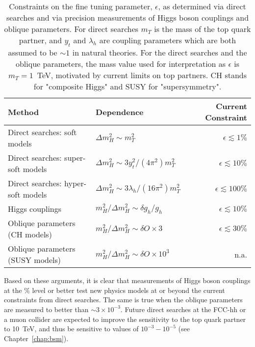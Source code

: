 \documentclass[../report.tex]{subfiles}
\newcommand{\commentsinout}[1]{#1}
\newcommand{\BH}[1]{\commentsinout{\textbf{\color{blue} [BH: #1]}}} %
\begin{document}
\begin{table}[htbp]
    \centering
     \caption{Constraints on the fine tuning parameter, $\epsilon$, as determined via direct searches and via precision measurements of Higgs boson couplings and oblique parameters. For direct searches $m_T$ is the mass of the top quark partner, and $y_t$ and $\lambda_h$ are coupling parameters which are both assumed to be $\sim 1$ in natural theories. %
     For the direct searches and the oblique parameters, the mass value used for interpretation as $\epsilon$ is $m_T=1$~TeV, motivated by current limits on top partners\cite{atlasstop,cmsstop,atlasvtop,cmsvtop}. CH stands for "composite Higgs" and SUSY for "supersymmetry".
    \label{tab:finetuning}}
    \begin{tabular}{l|l|r}
    \hline
    Method & Dependence & Current Constraint \\\hline\hline
         Direct searches: soft models  & $\Delta m_H^2 \sim m_T^2$ & $\epsilon\lesssim 1\%$ \\
        Direct searches: super-soft models & $\Delta m_H^2 \sim 3y_t^2/(4\pi^2)
    m_T^2$  & $\epsilon\lesssim 10\%$\\
        Direct searches: hyper-soft models & $\Delta m_H^2 \sim 3\lambda_h/(16\pi^2) m_T^2$  & $\epsilon \lesssim 100\%$\\\hline
         Higgs couplings & $m_H^2/\Delta m_H^2\sim \delta g_h/g_h$ & $\epsilon \lesssim 10\%$\\
         Oblique parameters (CH models)& $
         m_H^2/\Delta m_H^2 \sim 
         \delta O\times 3$ 
          & $\epsilon \lesssim 30\%$ \\
          Oblique parameters (SUSY models)& $
         m_H^2/\Delta m_H^2 \sim 
         \delta O\times 10^{3}$ 
          & n.a. \\
          \hline
    \end{tabular}
\end{table}
Based on these arguments, it is clear that measurements of Higgs boson couplings at the \% level or better test new physics models at or beyond the current constraints from direct searches. The same is true when the oblique parameters are measured to better than $\sim 3\times 10^{-3}$. Future direct searches at the FCC-hh or a muon collider are expected to improve the sensitivity to the top quark partner to 10~TeV, and thus be sensitive to values of $10^{-3}-10^{-5}$ (see Chapter~\ref{chap:bsm}). 
\end{document}
